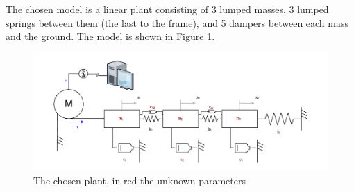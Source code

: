 \documentclass[twosided,a4paper]{article}           %
\begin{document}
The chosen model is a linear plant consisting of 3 lumped masses, 3 lumped springs between them (the last to the frame), and 5 dampers between each mass and the ground. The model is shown in Figure \ref{fig:theplant1}.
\begin{figure}[H]
	\centering
	\includegraphics[width=\linewidth]{img/theplant1}
	\caption[The linear plant]{The chosen plant, in red the unknown parameters}
	\label{fig:theplant1}
\end{figure} 
\end{document}
